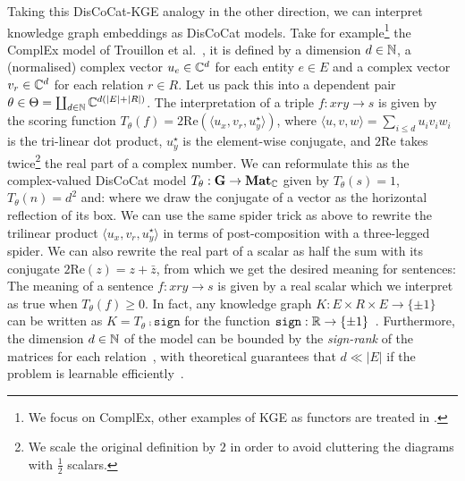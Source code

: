 Taking this DisCoCat-KGE analogy in the other direction, we can interpret knowledge graph embeddings as DisCoCat models.
Take for example\footnote
{We focus on ComplEx, other examples of KGE as functors are treated in \cite[Section~2.6]{Felice22}.}
the ComplEx model of Trouillon et al.~\cite{TrouillonEtAl16,TrouillonEtAl17}, it is defined by a dimension $d \in \mathbb{N}$, a (normalised) complex vector $u_e \in \mathbb{C}^d$ for each entity $e \in E$ and a complex vector $v_r \in \mathbb{C}^d$ for each relation $r \in R$.
Let us pack this into a dependent pair $\theta \in \Theta = \coprod_{d \in \mathbb{N}} \mathbb{C}^{d (\vert E \vert + \vert R \vert)}$.
The interpretation of a triple $f : x r y \to s$ is given by the scoring function $T_\theta(f) = 2 \text{Re}(\langle u_x, v_r, u_y^\star \rangle)$, where $\langle u, v, w \rangle = \sum_{i \leq d} u_i v_i w_i$ is the tri-linear dot product, $u_y^\star$ is the element-wise conjugate, and $2 \text{Re}$ takes twice\footnote
{We scale the original definition by $2$ in order to avoid cluttering the diagrams with $\frac{1}{2}$ scalars.} the real part of a complex number.
We can reformulate this as the complex-valued DisCoCat model $T_\theta : \mathbf{G} \to \mathbf{Mat}_{\mathbb{C}}$ given by $T_\theta(s) = 1$, $T_\theta(n) = d^2$ and:
where we draw the conjugate of a vector as the horizontal reflection of its box.
We can use the same spider trick as above to rewrite the trilinear product $\langle u_x, v_r, u_y^\star \rangle$ in terms of post-composition with a three-legged spider.
We can also rewrite the real part of a scalar as half the sum with its conjugate $2 \text{Re}(z) = z + \bar z$, from which we get the desired meaning for sentences:
The meaning of a sentence $f : x r y \to s$ is given by a real scalar which we interpret as true when $T_\theta(f) \geq 0$.
In fact, any knowledge graph $K : E \times R \times E \to \{ \pm 1 \}$ can be written as $K = T_\theta \fcmp \mathtt{sign}$ for the function $\mathtt{sign} : \mathbb{R} \to \{ \pm 1 \}$~\cite[Theorem~4]{TrouillonEtAl17}.
Furthermore, the dimension $d \in \mathbb{N}$ of the model can be bounded by the \emph{sign-rank} of the matrices for each relation~\cite[Proposition~2.5.17]{Felice22}, with theoretical guarantees that $d \ll \vert E \vert$ if the problem is learnable efficiently~\cite{AlonEtAl16a}.

